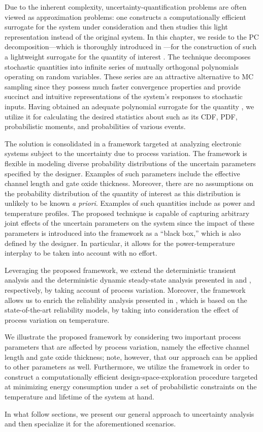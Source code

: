 Due to the inherent complexity, uncertainty-quantification problems are often
viewed as approximation problems: one constructs a computationally efficient
surrogate for the system under consideration and then studies this light
representation instead of the original system. In this chapter, we reside to the
\ac{PC} decomposition---which is thoroughly introduced in
---for the construction of such a lightweight surrogate
for the quantity of interest \g. The technique decomposes stochastic quantities
into infinite series of mutually orthogonal polynomials operating on random
variables. These series are an attractive alternative to \ac{MC} sampling since
they possess much faster convergence properties and provide succinct and
intuitive representations of the system's responses to stochastic inputs. Having
obtained an adequate polynomial surrogate for the quantity \g, we utilize it for
calculating the desired statistics about \g such as its \ac{CDF}, \ac{PDF},
probabilistic moments, and probabilities of various events.

The solution is consolidated in a framework targeted at analyzing electronic
systems subject to the uncertainty due to process variation. The framework is
flexible in modeling diverse probability distributions of the uncertain
parameters specified by the designer. Examples of such parameters include the
effective channel length and gate oxide thickness. Moreover, there are no
assumptions on the probability distribution of the quantity of interest as this
distribution is unlikely to be known \emph{a priori}. Examples of such
quantities include as power and temperature profiles. The proposed technique is
capable of capturing arbitrary joint effects of the uncertain parameters on the
system since the impact of these parameters is introduced into the framework as
a ``black box,'' which is also defined by the designer. In particular, it allows
for the power-temperature interplay to be taken into account with no effort.

Leveraging the proposed framework, we extend the deterministic transient
analysis and the deterministic dynamic steady-state analysis presented in
 and , respectively, by
taking account of process variation. Moreover, the framework allows us to enrich
the reliability analysis presented in , which is based
on the state-of-the-art reliability models, by taking into consideration the
effect of process variation on temperature.

We illustrate the proposed framework by considering two important process
parameters that are affected by process variation, namely the effective channel
length and gate oxide thickness; note, however, that our approach can be applied
to other parameters as well. Furthermore, we utilize the framework in order to
construct a computationally efficient design-space-exploration procedure
targeted at minimizing energy consumption under a set of probabilistic
constraints on the temperature and lifetime of the system at hand.

In what follow sections, we present our general approach to uncertainty analysis
and then specialize it for the aforementioned scenarios.
